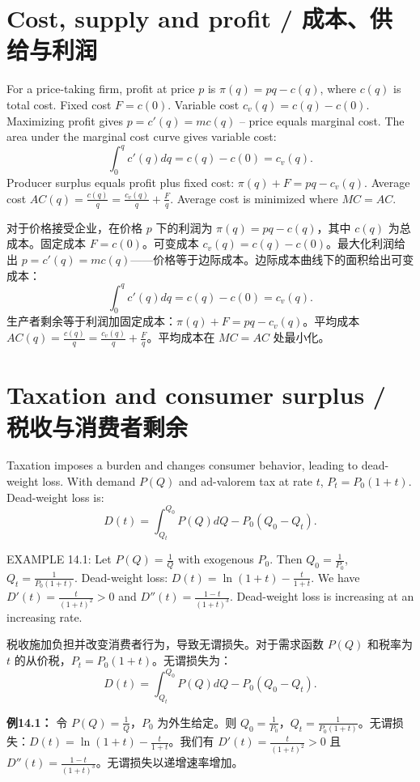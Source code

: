\section{Cost, supply and profit / 成本、供给与利润}

\begin{original}
For a price-taking firm, profit at price $p$ is $\pi(q) = pq - c(q)$, where $c(q)$ is total cost. Fixed cost $F = c(0)$. Variable cost $c_v(q) = c(q) - c(0)$. Maximizing profit gives $p = c'(q) = mc(q)$ -- price equals marginal cost. The area under the marginal cost curve gives variable cost:
\[
\int_0^q c'(q)dq = c(q) - c(0) = c_v(q).
\]
Producer surplus equals profit plus fixed cost: $\pi(q) + F = pq - c_v(q)$. Average cost $AC(q) = \frac{c(q)}{q} = \frac{c_v(q)}{q} + \frac{F}{q}$. Average cost is minimized where $MC = AC$.
\end{original}
\begin{translation}
对于价格接受企业，在价格 $p$ 下的利润为 $\pi(q) = pq - c(q)$，其中 $c(q)$ 为总成本。固定成本 $F = c(0)$。可变成本 $c_v(q) = c(q) - c(0)$。最大化利润给出 $p = c'(q) = mc(q)$——价格等于边际成本。边际成本曲线下的面积给出可变成本：
\[
\int_0^q c'(q)dq = c(q) - c(0) = c_v(q).
\]
生产者剩余等于利润加固定成本：$\pi(q) + F = pq - c_v(q)$。平均成本 $AC(q) = \frac{c(q)}{q} = \frac{c_v(q)}{q} + \frac{F}{q}$。平均成本在 $MC = AC$ 处最小化。
\end{translation}

\section{Taxation and consumer surplus / 税收与消费者剩余}

\begin{original}
Taxation imposes a burden and changes consumer behavior, leading to dead-weight loss. With demand $P(Q)$ and ad-valorem tax at rate $t$, $P_t = P_0(1+t)$. Dead-weight loss is:
\[
D(t) = \int_{Q_t}^{Q_0} P(Q)dQ - P_0(Q_0 - Q_t). \tag{14.2}
\]

EXAMPLE 14.1: Let $P(Q) = \frac{1}{Q}$ with exogenous $P_0$. Then $Q_0 = \frac{1}{P_0}$, $Q_t = \frac{1}{P_0(1+t)}$. Dead-weight loss: $D(t) = \ln(1+t) - \frac{t}{1+t}$. We have $D'(t) = \frac{t}{(1+t)^2} > 0$ and $D''(t) = \frac{1-t}{(1+t)^3}$. Dead-weight loss is increasing at an increasing rate.
\end{original}
\begin{translation}
税收施加负担并改变消费者行为，导致无谓损失。对于需求函数 $P(Q)$ 和税率为 $t$ 的从价税，$P_t = P_0(1+t)$。无谓损失为：
\[
D(t) = \int_{Q_t}^{Q_0} P(Q)dQ - P_0(Q_0 - Q_t). \tag{14.2}
\]

\textbf{例14.1：} 令 $P(Q) = \frac{1}{Q}$，$P_0$ 为外生给定。则 $Q_0 = \frac{1}{P_0}$，$Q_t = \frac{1}{P_0(1+t)}$。无谓损失：$D(t) = \ln(1+t) - \frac{t}{1+t}$。我们有 $D'(t) = \frac{t}{(1+t)^2} > 0$ 且 $D''(t) = \frac{1-t}{(1+t)^3}$。无谓损失以递增速率增加。
\end{translation}

